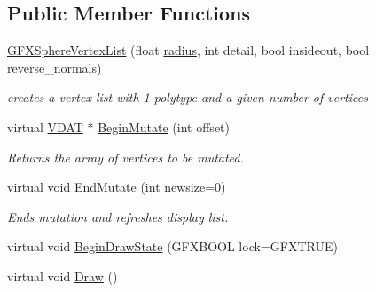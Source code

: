\subsection*{Public Member Functions}
\begin{DoxyCompactItemize}
\item 
\hyperlink{classGFXSphereVertexList_a2aae4cdb061f80611bfa0c7570cc7f41}{G\+F\+X\+Sphere\+Vertex\+List} (float \hyperlink{classGFXSphereVertexList_af159c8d27cfd8958c62847c7b0a0ef72}{radius}, int detail, bool insideout, bool reverse\+\_\+normals)\hypertarget{classGFXSphereVertexList_a2aae4cdb061f80611bfa0c7570cc7f41}{}\label{classGFXSphereVertexList_a2aae4cdb061f80611bfa0c7570cc7f41}

\begin{DoxyCompactList}\small\item\em creates a vertex list with 1 polytype and a given number of vertices \end{DoxyCompactList}\item 
virtual \hyperlink{unionGFXVertexList_1_1VDAT}{V\+D\+AT} $\ast$ \hyperlink{classGFXSphereVertexList_a81443dc562b004991ca0b6c0c897248f}{Begin\+Mutate} (int offset)\hypertarget{classGFXSphereVertexList_a81443dc562b004991ca0b6c0c897248f}{}\label{classGFXSphereVertexList_a81443dc562b004991ca0b6c0c897248f}

\begin{DoxyCompactList}\small\item\em Returns the array of vertices to be mutated. \end{DoxyCompactList}\item 
virtual void \hyperlink{classGFXSphereVertexList_a3533d6a1549db39bce69bb681c8baaff}{End\+Mutate} (int newsize=0)\hypertarget{classGFXSphereVertexList_a3533d6a1549db39bce69bb681c8baaff}{}\label{classGFXSphereVertexList_a3533d6a1549db39bce69bb681c8baaff}

\begin{DoxyCompactList}\small\item\em Ends mutation and refreshes display list. \end{DoxyCompactList}\item 
virtual void \hyperlink{classGFXSphereVertexList_af80a8ac097f61c86aed76ee7b12968e4}{Begin\+Draw\+State} (G\+F\+X\+B\+O\+OL lock=G\+F\+X\+T\+R\+UE)
\item 
virtual void \hyperlink{classGFXSphereVertexList_a015ab21af69ce3201dbdfc2ff2285082}{Draw} ()\hypertarget{classGFXSphereVertexList_a015ab21af69ce3201dbdfc2ff2285082}{}\label{classGFXSphereVertexList_a015ab21af69ce3201dbdfc2ff2285082}


\end{DoxyCompactItemize}
